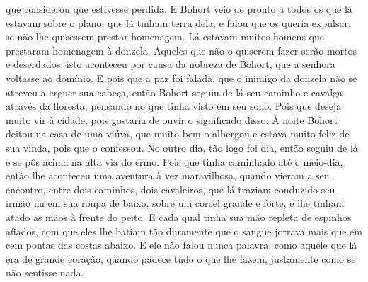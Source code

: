 que considerou que estivesse perdida. E Bohort veio de pronto a todos os que lá
estavam sobre o plano, que lá tinham terra dela, e falou que os queria
expulsar, se não lhe quisessem prestar homenagem.  Lá estavam muitos
homens que prestaram homenagem à donzela. Aqueles que não o quiserem fazer
serão mortos e deserdados; isto aconteceu por causa da nobreza de Bohort, que a
senhora voltasse ao domínio. E pois que a paz foi falada, que o inimigo da
donzela não se atreveu a erguer sua cabeça, então Bohort seguiu de lá seu
caminho e cavalga através da floresta, pensando no que tinha visto em seu sono.
Pois que deseja muito vir à cidade, pois gostaria de ouvir o significado disso.
À noite Bohort deitou na casa de uma viúva, que muito bem o albergou e estava
muito feliz de sua vinda, pois que o confessou. No outro dia, tão logo foi dia,
então seguiu de lá e se pôs acima na alta via do ermo. Pois que tinha caminhado
até o meio-dia, então lhe aconteceu uma aventura à vez maravilhosa, quando
vieram a seu encontro, entre dois caminhos, dois cavaleiros, que lá traziam
conduzido seu irmão nu em sua roupa de baixo, sobre um corcel grande e forte, e
lhe tinham atado as mãos à frente do peito. E cada qual tinha sua mão repleta
de espinhos afiados, com que eles lhe batiam tão duramente que o sangue jorrava
mais que em cem pontas das costas abaixo. E ele não falou nunca palavra, como
aquele que lá era de grande coração, quando padece tudo o que lhe fazem,
justamente como se não sentisse nada.

